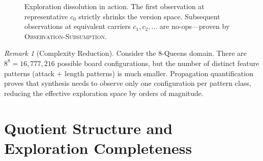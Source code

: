 \documentclass[9pt,a4paper]{article}
\theoremstyle{plain}
\theoremstyle{definition}
\theoremstyle{remark}
\newtheorem{remark}{Remark}
\begin{document}
\begin{figure}[H]
\centering
{}
\caption{Exploration dissolution in action.  The first observation at representative $c_0$ strictly shrinks the version space.  Subsequent observations at equivalent carriers $c_1, c_2, \ldots$ are no-ops---proven by \textsc{Observation-Subsumption}.}
\label{fig:dissolution}
\end{figure}

\begin{remark}[Complexity Reduction]
Consider the 8-Queens domain.  There are $8^8 = 16{,}777{,}216$ possible board configurations, but the number of distinct feature patterns (attack + length patterns) is much smaller.  Propagation quantification proves that synthesis needs to observe only one configuration per pattern class, reducing the effective exploration space by orders of magnitude.
\end{remark}



\section{Quotient Structure and Exploration Completeness}
\label{sec:quotient}
\end{document}
